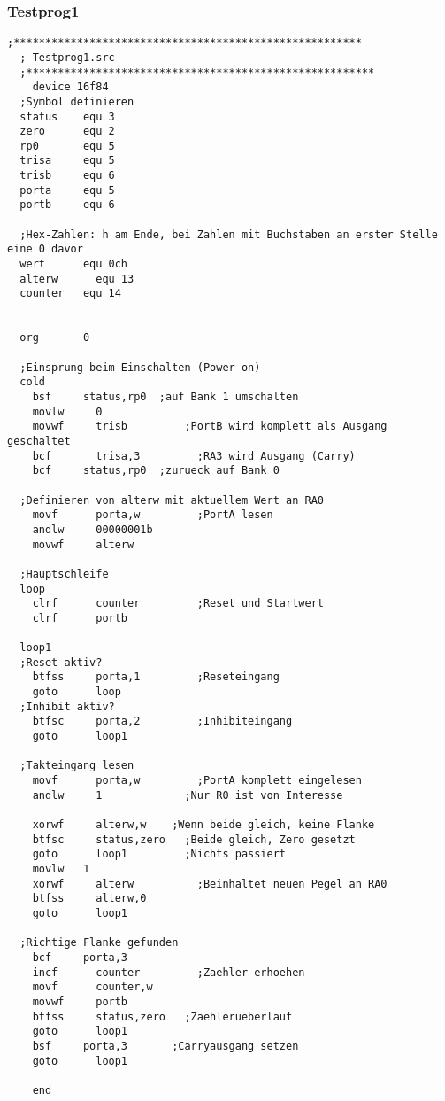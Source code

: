\subsubsection*{Testprog1}
\begin{lstlisting}[language=avr]
  ;*******************************************************
  ; Testprog1.src
  ;*******************************************************
    device 16f84
  ;Symbol definieren
  status    equ 3
  zero      equ 2
  rp0 	    equ 5
  trisa	    equ 5
  trisb	    equ 6
  porta	    equ 5
  portb	    equ 6

  ;Hex-Zahlen: h am Ende, bei Zahlen mit Buchstaben an erster Stelle eine 0 davor
  wert	    equ 0ch
  alterw	  equ 13
  counter   equ 14
  
  
  org       0
    
  ;Einsprung beim Einschalten (Power on)
  cold
    bsf	    status,rp0	;auf Bank 1 umschalten
    movlw	  0
    movwf	  trisb		    ;PortB wird komplett als Ausgang geschaltet
    bcf 	  trisa,3		  ;RA3 wird Ausgang (Carry)
    bcf	    status,rp0	;zurueck auf Bank 0
  
  ;Definieren von alterw mit aktuellem Wert an RA0
    movf	  porta,w		  ;PortA lesen
    andlw	  00000001b
    movwf	  alterw

  ;Hauptschleife
  loop
    clrf	  counter		  ;Reset und Startwert
    clrf	  portb

  loop1
  ;Reset aktiv?
    btfss	  porta,1		  ;Reseteingang
    goto 	  loop
  ;Inhibit aktiv?
    btfsc	  porta,2		  ;Inhibiteingang
    goto 	  loop1
  
  ;Takteingang lesen
    movf	  porta,w		  ;PortA komplett eingelesen
    andlw	  1		        ;Nur R0 ist von Interesse
  
    xorwf	  alterw,w	  ;Wenn beide gleich, keine Flanke
    btfsc	  status,zero	;Beide gleich, Zero gesetzt
    goto	  loop1		    ;Nichts passiert
    movlw   1
    xorwf	  alterw		  ;Beinhaltet neuen Pegel an RA0
    btfss	  alterw,0
    goto	  loop1
  
  ;Richtige Flanke gefunden
    bcf	    porta,3
    incf	  counter		  ;Zaehler erhoehen
    movf 	  counter,w
    movwf	  portb
    btfss	  status,zero	;Zaehlerueberlauf
    goto	  loop1
    bsf	    porta,3		  ;Carryausgang setzen
    goto	  loop1
  
    end

\end{lstlisting}